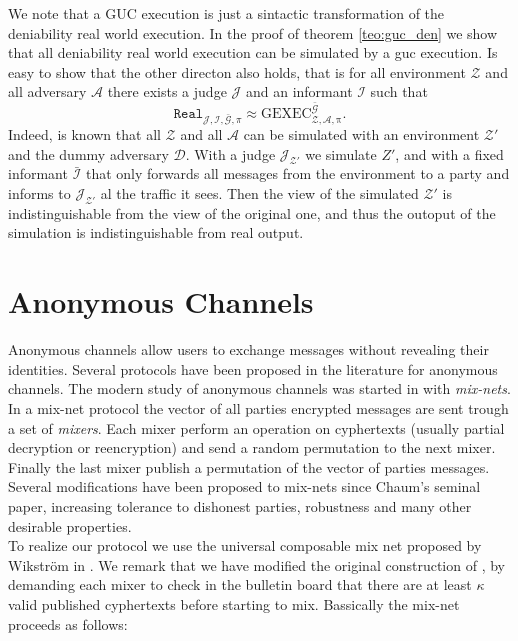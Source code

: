\documentclass{acm_proc_article-sp}
\begin{document}
We note that a GUC execution is just a sintactic transformation of the deniability real world execution.
In the proof of theorem \ref{teo:guc_den} we show that all deniability real world execution can be simulated
by a guc execution. Is easy to show that the other directon also holds, that is for all environment $\mathcal{Z}$
and all adversary $\mathcal{A}$ there exists a judge $\mathcal{J}$ and an informant $\mathcal{I}$ such that
$$
\mathtt{Real}_{\mathcal{J, I,\bar{G}},\pi}
\approx
\mathrm
{
    GEXEC
    ^{
        \bar{\mathcal{G}}
    }
    _{
        \mathcal{Z},
        \mathcal{A},
        \pi
     }
}.
$$
Indeed, is known that all $\mathcal{Z}$ and all $\mathcal{A}$ can be simulated with an environment $\mathcal{Z}'$
and the dummy adversary $\mathcal{D}$. With a judge $\mathcal{J_{Z'}}$ we simulate $Z'$, and with a fixed informant
$\bar{\mathcal{I}}$ that only forwards all messages from the environment to a party and informs to
$\mathcal{J_{Z'}}$ al the traffic it sees. Then the view of the simulated $\mathcal{Z'}$ is indistinguishable
from the view of the original one, and thus the outoput of the simulation is indistinguishable from real output.

\section{Anonymous Channels} \label{sect:AC}
Anonymous channels allow users to exchange messages without revealing their identities. Several protocols
have been proposed in the literature for anonymous channels. The modern study of anonymous channels was
started in \cite{journals/cacm/Chaum81} with \textit{mix-nets}. In a mix-net protocol the vector of all
parties encrypted messages are sent trough a set of \textit{mixers}. Each mixer perform an operation on cyphertexts
(usually partial decryption or reencryption) and send a random permutation to the next mixer. Finally the
last mixer publish a permutation of the vector of parties messages. Several modifications have been proposed
to mix-nets since Chaum's seminal paper, increasing tolerance to dishonest parties, robustness and many other
desirable properties.\\
To realize our protocol we use the universal composable mix net proposed by Wikstr\"om in \cite{Wikstrom04a}.
We remark that we have modified the original construction of \cite{Wikstrom04a}, by demanding each mixer to
check in the bulletin board that there are at least $\kappa$ valid published cyphertexts before starting
to mix.
Bassically the mix-net proceeds as follows:
\end{document}
